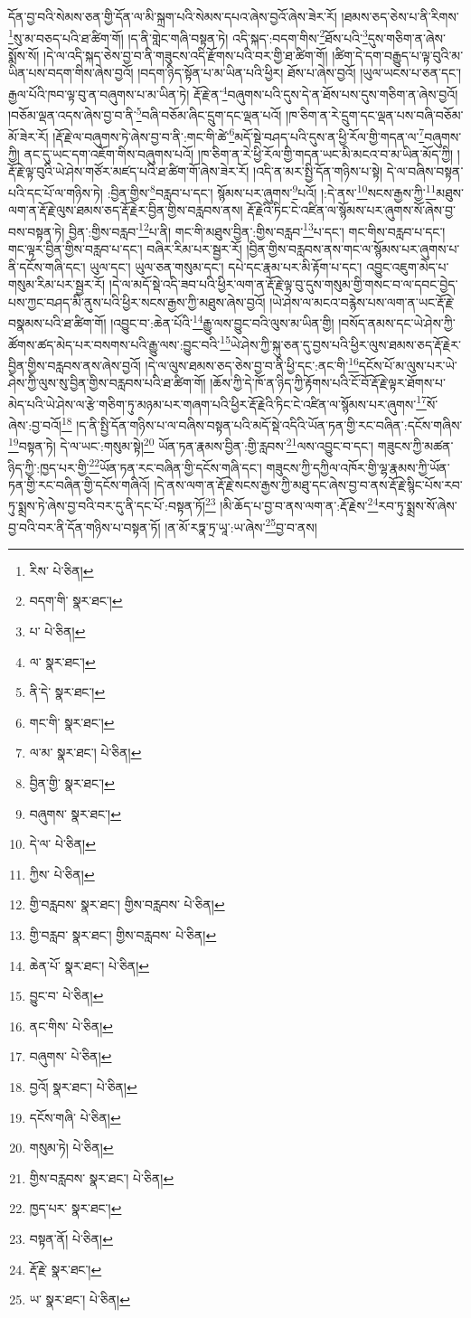 དོན་བྱ་བའི་སེམས་ཅན་གྱི་དོན་ལ་མི་སྐྲག་པའི་སེམས་དཔའ་ཞེས་བྱའོ་ཞེས་ཟེར་རོ། །ཐམས་ཅད་ཅེས་པ་ནི་རིགས་\footnote{རིས་  པེ་ཅིན། }སུ་མ་བཅད་པའི་ཐ་ཚིག་གོ། །ད་ནི་གླེང་གཞི་བསྟན་ཏེ། འདི་སྐད་:བདག་གིས་\footnote{བདག་གི་  སྣར་ཐང་། }ཐོས་པའི་\footnote{པ་  པེ་ཅིན། }དུས་གཅིག་ན་ཞེས་སྨོས་སོ། །དེ་ལ་འདི་སྐད་ཅེས་བྱ་བ་ནི་གཟུངས་འདི་རྫོགས་པའི་བར་གྱི་ཐ་ཚིག་གོ། །ཚིག་དེ་དག་བརྒྱུད་པ་ལྟ་བུའི་མ་ཡིན་པས་བདག་གིས་ཞེས་བྱའོ། །བདག་ཉིད་སྟོན་པ་མ་ཡིན་པའི་ཕྱིར། ཐོས་པ་ཞེས་བྱའོ། །ཡུལ་ཡངས་པ་ཅན་དང་། རྒྱལ་པོའི་ཁབ་ལྟ་བུ་ན་བཞུགས་པ་མ་ཡིན་ཏེ། རྡོ་རྗེ་ན་\footnote{ལ་  སྣར་ཐང་། }བཞུགས་པའི་དུས་དེ་ན་ཐོས་པས་དུས་གཅིག་ན་ཞེས་བྱའོ། །བཅོམ་ལྡན་འདས་ཞེས་བྱ་བ་ནི་\footnote{ནི་དེ་  སྣར་ཐང་། }བཞི་བཅོམ་ཞིང་དྲུག་དང་ལྡན་པའོ། །ཁ་ཅིག་ན་རེ་དྲུག་དང་ལྡན་པས་བཞི་བཅོམ་མོ་ཟེར་རོ། །རྡོ་རྗེ་ལ་བཞུགས་ཏེ་ཞེས་བྱ་བ་ནི་:གང་གི་ཚེ་\footnote{གང་གི་  སྣར་ཐང་། }མདོ་སྡེ་བཤད་པའི་དུས་ན་ཕྱི་རོལ་གྱི་གདན་ལ་\footnote{ལ་མ་  སྣར་ཐང་།  པེ་ཅིན། }བཞུགས་ཀྱི། ནང་དུ་ཡང་དག་འཇོག་གིས་བཞུགས་པའོ། །ཁ་ཅིག་ན་རེ་ཕྱི་རོལ་གྱི་གདན་ཡང་མི་མངའ་བ་མ་ཡིན་མོད་ཀྱི། །རྡོ་རྗེ་ལྟ་བུའི་ཡེ་ཤེས་གཙོར་མཛད་པའི་ཐ་ཚིག་གོ་ཞེས་ཟེར་རོ། །འདི་ན་མར་སྤྱི་དོན་གཉིས་པ་སྟེ། དེ་ལ་བཞིས་བསྟན་པའི་དང་པོ་ལ་གཉིས་ཏེ། :བྱིན་གྱིས་\footnote{བྱིན་གྱི་  སྣར་ཐང་། }བརླབ་པ་དང་། སྙོམས་པར་ཞུགས་\footnote{བཞུགས་  སྣར་ཐང་། }པའོ། །:དེ་ནས་\footnote{དེ་ལ་  པེ་ཅིན། }སངས་རྒྱས་ཀྱི་\footnote{ཀྱིས་  པེ་ཅིན། }མཐུས་ལག་ན་རྡོ་རྗེ་ལུས་ཐམས་ཅད་རྡོ་རྗེར་བྱིན་གྱིས་བརླབས་ནས། རྡོ་རྗེའི་ཏིང་ངེ་འཛིན་ལ་སྙོམས་པར་ཞུགས་སོ་ཞེས་བྱ་བས་བསྟན་ཏེ། བྱིན་:གྱིས་བརླབ་\footnote{གྱི་བརླབས་  སྣར་ཐང་། གྱིས་བརླབས་  པེ་ཅིན། }པ་ནི། གང་གི་མཐུས་བྱིན་:གྱིས་བརླབ་\footnote{གྱི་བརླབ་  སྣར་ཐང་། གྱིས་བརླབས་  པེ་ཅིན། }པ་དང་། གང་གིས་བརླབ་པ་དང་། གང་ལྟར་བྱིན་གྱིས་བརླབ་པ་དང་། བཞིར་རིམ་པར་སྦྱར་རོ། །བྱིན་གྱིས་བརླབས་ནས་གང་ལ་སྙོམས་པར་ཞུགས་པ་ནི་དངོས་གཞི་དང་། ཡུལ་དང་། ཡུལ་ཅན་གསུམ་དང་། དཔེ་དང་རྣམ་པར་མི་རྟོག་པ་དང་། འབྱུང་འཇུག་མེད་པ་གསུམ་རིམ་པར་སྦྱར་རོ། །དེ་ལ་མདོ་སྡེ་འདི་ཟབ་པའི་ཕྱིར་ལག་ན་རྡོ་རྗེ་ལྟ་བུ་དུས་གསུམ་གྱི་གསང་བ་ལ་དབང་བྱེད་པས་ཀྱང་བཤད་མི་ནུས་པའི་ཕྱིར་སངས་རྒྱས་ཀྱི་མཐུས་ཞེས་བྱའོ། །ཡེ་ཤེས་ལ་མངའ་བརྙེས་པས་ལག་ན་ཡང་རྡོ་རྗེ་བསྣམས་པའི་ཐ་ཚིག་གོ། །འབྱུང་བ་:ཆེན་པོའི་\footnote{ཆེན་པོ་  སྣར་ཐང་།  པེ་ཅིན། }རྒྱུ་ལས་བྱུང་བའི་ལུས་མ་ཡིན་གྱི། །བསོད་ནམས་དང་ཡེ་ཤེས་ཀྱི་ཚོགས་ཚད་མེད་པར་བསགས་པའི་རྒྱུ་ལས་:བྱུང་བའི་\footnote{བྱུང་བ་  པེ་ཅིན། }ཡེ་ཤེས་ཀྱི་སྐུ་ཅན་དུ་བྱས་པའི་ཕྱིར་ལུས་ཐམས་ཅད་རྡོ་རྗེར་བྱིན་གྱིས་བརླབས་ནས་ཞེས་བྱའོ། །དེ་ལ་ལུས་ཐམས་ཅད་ཅེས་བྱ་བ་ནི་ཕྱི་དང་:ནང་གི་\footnote{ནང་གིས་  པེ་ཅིན། }དངོས་པོ་མ་ལུས་པར་ཡེ་ཤེས་ཀྱི་ལུས་སུ་བྱིན་གྱིས་བརླབས་པའི་ཐ་ཚིག་གོ། །ཆོས་ཀྱི་དེ་ཁོ་ན་ཉིད་ཀྱི་རྟོགས་པའི་ངོ་བོ་རྡོ་རྗེ་ལྟར་ཐོགས་པ་མེད་པའི་ཡེ་ཤེས་ལ་རྩེ་གཅིག་ཏུ་མཉམ་པར་གཞག་པའི་ཕྱིར་རྡོ་རྗེའི་ཏིང་ངེ་འཛིན་ལ་སྙོམས་པར་ཞུགས་\footnote{བཞུགས་  པེ་ཅིན། }སོ་ཞེས་:བྱ་བའོ།\footnote{བྱའོ།  སྣར་ཐང་།  པེ་ཅིན། } །ད་ནི་སྤྱི་དོན་གཉིས་པ་ལ་བཞིས་བསྟན་པའི་མདོ་སྡེ་འདིའི་ཡོན་ཏན་གྱི་རང་བཞིན་:དངོས་གཞིས་\footnote{དངོས་གཞི་  པེ་ཅིན། }བསྟན་ཏེ། དེ་ལ་ཡང་:གསུམ་སྟེ།\footnote{གསུམ་ཏེ།  པེ་ཅིན། } ཡོན་ཏན་རྣམས་བྱིན་:གྱི་རླབས་\footnote{གྱིས་བརླབས་  སྣར་ཐང་།  པེ་ཅིན། }ལས་འབྱུང་བ་དང་། གཟུངས་ཀྱི་མཚན་ཉིད་ཀྱི་:ཁྱད་པར་གྱི་\footnote{ཁྱད་པར་  སྣར་ཐང་། }ཡོན་ཏན་རང་བཞིན་གྱི་དངོས་གཞི་དང་། གཟུངས་ཀྱི་དཀྱིལ་འཁོར་གྱི་ལྷ་རྣམས་ཀྱི་ཡོན་ཏན་གྱི་རང་བཞིན་གྱི་དངོས་གཞིའོ། །དེ་ནས་ལག་ན་རྡོ་རྗེ་སངས་རྒྱས་ཀྱི་མཐུ་དང་ཞེས་བྱ་བ་ནས་རྡོ་རྗེ་སྙིང་པོས་རབ་ཏུ་སྨྲས་ཏེ་ཞེས་བྱ་བའི་བར་དུ་ནི་དང་པོ་:བསྟན་ཏོ།\footnote{བསྟན་ནོ།  པེ་ཅིན། } །མི་ཆོད་པ་བྱ་བ་ནས་ལག་ན་:རྡོ་རྗེས་\footnote{རྡོ་རྗེ་  སྣར་ཐང་། }རབ་ཏུ་སྨྲས་སོ་ཞེས་བྱ་བའི་བར་ནི་དོན་གཉིས་པ་བསྟན་ཏོ། །ན་མོ་རཏྣ་ཏྲ་ཡཱ་:ཡ་ཞེས་\footnote{ཡ་  སྣར་ཐང་།  པེ་ཅིན། }བྱ་བ་ནས། 